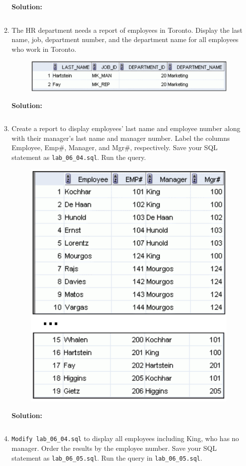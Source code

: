 \documentclass[a4paper,12pt]{article}
\begin{document}
\begin{enumerate}
    \textbf{Solution: }
    \begin{lstlisting}[language=SQL]

    \end{lstlisting}
    \newpage
    \item The HR department needs a report of employees in Toronto. Display the last name, job,
department number, and the department name for all employees who work in Toronto.
    \begin{figure}[h]
        \centering
            \centering
            \includegraphics[width=.4\linewidth]{graphics/63.png}
    \end{figure}
    
    \textbf{Solution: }
    \begin{lstlisting}[language=SQL]

    \end{lstlisting}
        \item Create a report to display employees' last name and employee number along with their
manager's last name and manager number. Label the columns Employee, Emp\#, Manager,
and Mgr\#, respectively. Save your SQL statement as \texttt{lab\_06\_04.sql}. Run the query.
    \begin{figure}[h]
        \centering
            \centering
            \includegraphics[width=.35\linewidth]{graphics/64.png}
    \end{figure}
    \newpage
    \textbf{Solution: }
    \begin{lstlisting}[language=SQL]

    \end{lstlisting}
        \item \texttt{Modify\ lab\_06\_04.sql} to display all employees including King, who has no manager.
Order the results by the employee number. Save your SQL statement as \texttt{lab\_06\_05.sql}.
Run the query in \texttt{lab\_06\_05.sql}.
    

\end{enumerate}
\end{document}
